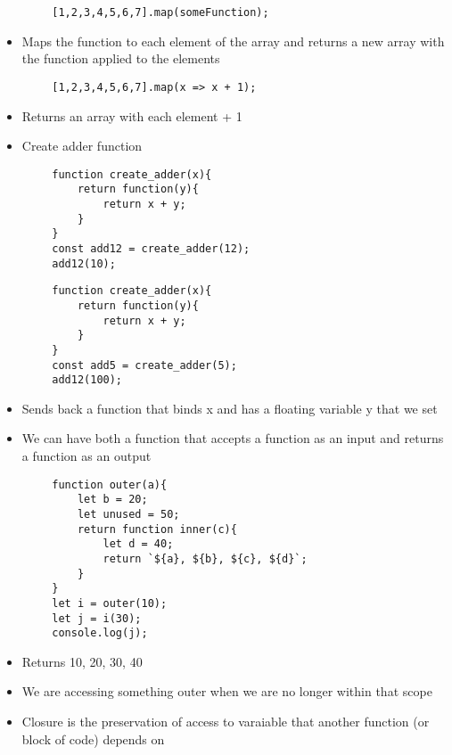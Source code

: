 \documentclass{article}
\begin{document}
\begin{itemize}
    \begin{lstlisting}
        [1,2,3,4,5,6,7].map(someFunction);
    \end{lstlisting}
    \begin{itemize}
        \item Maps the function to each element of the array and returns a new array with the function applied to the elements
    \end{itemize}
    \begin{lstlisting}
        [1,2,3,4,5,6,7].map(x => x + 1);
    \end{lstlisting}
    \begin{itemize}
        \item Returns an array with each element + 1
        \item Create adder function
    \end{itemize}
    \begin{lstlisting}
        function create_adder(x){
            return function(y){
                return x + y;
            }
        }
        const add12 = create_adder(12);
        add12(10);
    \end{lstlisting}
    \begin{lstlisting}
        function create_adder(x){
            return function(y){
                return x + y;
            }
        }
        const add5 = create_adder(5);
        add12(100);
    \end{lstlisting}
    \begin{itemize}
        \item Sends back a function that binds x and has a floating variable y that we set
        \item We can have both a function that accepts a function as an input and returns a function as an output
    \end{itemize}
    \begin{lstlisting}
        function outer(a){
            let b = 20;
            let unused = 50;
            return function inner(c){
                let d = 40;
                return `${a}, ${b}, ${c}, ${d}`;
            }
        }
        let i = outer(10);
        let j = i(30);
        console.log(j);
    \end{lstlisting}
    \begin{itemize}
        \item Returns 10, 20, 30, 40
        \item We are accessing something outer when we are no longer within that scope
        \item Closure is the preservation of access to varaiable that another function (or block of code) depends on 

\end{itemize}
\end{itemize}
\end{document}
